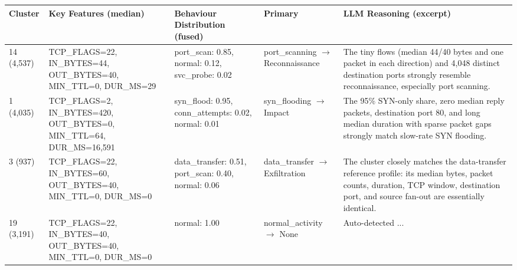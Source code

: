 \begin{tabular}{p{1.2cm} p{4.2cm} p{4cm} p{2.3cm} p{3.8cm}}
\toprule
\textbf{Cluster} & \textbf{Key Features (median)} & \textbf{Behaviour Distribution (fused)} & \textbf{Primary} & \textbf{LLM Reasoning (excerpt)} \\
\midrule
14 (4,537) & TCP\_FLAGS=22, IN\_BYTES=44, OUT\_BYTES=40, MIN\_TTL=0, DUR\_MS=29 & port\_scan: 0.85, normal: 0.12, svc\_probe: 0.02 & port\_scanning $\to$ Reconnaissance & The tiny flows (median 44/40 bytes and one packet in each direction) and 4,048 distinct destination ports strongly resemble reconnaissance, especially port scanning. \\
\midrule
1 (4,035) & TCP\_FLAGS=2, IN\_BYTES=420, OUT\_BYTES=0, MIN\_TTL=64, DUR\_MS=16,591 & syn\_flood: 0.95, conn\_attempts: 0.02, normal: 0.01 & syn\_flooding $\to$ Impact & The 95\% SYN-only share, zero median reply packets, destination port 80, and long median duration with sparse packet gaps strongly match slow-rate SYN flooding. \\
\midrule
3 (937) & TCP\_FLAGS=22, IN\_BYTES=60, OUT\_BYTES=40, MIN\_TTL=0, DUR\_MS=0 & data\_transfer: 0.51, port\_scan: 0.40, normal: 0.06 & data\_transfer $\to$ Exfiltration & The cluster closely matches the data-transfer reference profile: its median bytes, packet counts, duration, TCP window, destination port, and source fan-out are essentially identical. \\
\midrule
19 (3,191) & TCP\_FLAGS=22, IN\_BYTES=40, OUT\_BYTES=40, MIN\_TTL=0, DUR\_MS=0 & normal: 1.00 & normal\_activity $\to$ None & Auto-detected ... \\
\bottomrule
\end{tabular}
